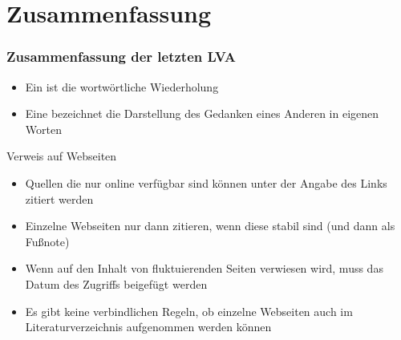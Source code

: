 
\section{Zusammenfassung}
\begin{frame}
\frametitle{Zusammenfassung der letzten LVA}  
  
\begin{Definition}
  \begin{itemize}
  \item Ein  ist die wortwörtliche Wiederholung
  \item Eine  bezeichnet die Darstellung des Gedanken eines 
    Anderen in eigenen Worten
  \end{itemize}
\end{Definition}

\medskip
\begin{mybox}{Verweis auf Webseiten}
\begin{itemize}
\item Quellen die nur online verfügbar sind können unter der Angabe
des Links zitiert werden
\item Einzelne Webseiten nur dann zitieren, wenn diese stabil sind (und dann
als Fußnote)
\item Wenn auf den Inhalt von fluktuierenden Seiten verwiesen wird, muss
das Datum des  Zugriffs beigefügt werden
\item Es gibt keine verbindlichen Regeln, ob einzelne Webseiten auch im
Literaturverzeichnis aufgenommen werden können
\end{itemize}
\end{mybox}
\end{frame}

